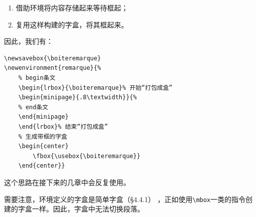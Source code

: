 \begin{enumerate}
    \item 借助环境将内容存储起来等待框起；
    \item 复用这样构建的字盒，将其框起来。
\end{enumerate}

因此，我们有：

\begin{dmd}
\begin{verbatim}
\newsavebox{\boiteremarque} 
\newenvironment{remarque}{%
    % begin条文
    \begin{lrbox}{\boiteremarque}% 开始“打包成盒”
    \begin{minipage}{.8\textwidth}}{%
    % end条文
    \end{minipage}
    \end{lrbox}% 结束“打包成盒”
    % 生成带框的字盒
    \begin{center}
        \fbox{\usebox{\boiteremarque}}
    \end{center}}\end{verbatim}
\end{dmd}

\newsavebox{\boiteremarque} 
\renewenvironment{remarque}{%
    \begin{lrbox}{\boiteremarque}%
    \begin{minipage}{.8\textwidth}}{%
    \end{minipage}
    \end{lrbox}%
    \begin{center}
        \fbox{\usebox{\boiteremarque}}
    \end{center}}


这个思路在接下来的几章中会反复使用。

\begin{exclamation}
需要注意，环境定义的字盒是简单字盒（\S 4.4.1）%
，正如使用\verb|\mbox|一类的指令创建的字盒一样。因此，字盒中无法切换段落。
\end{exclamation}